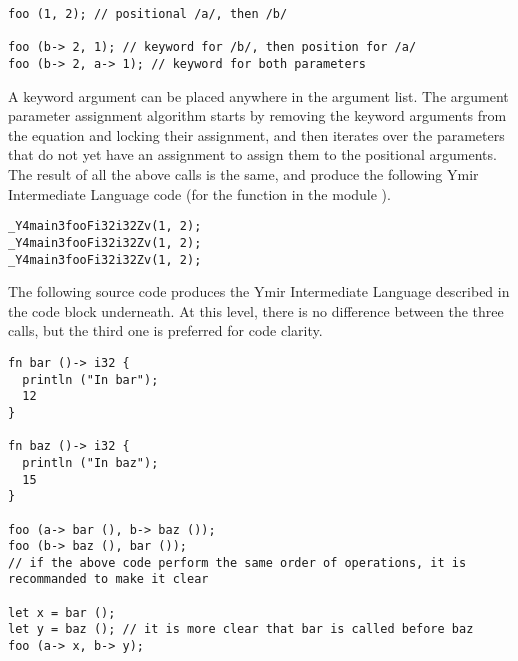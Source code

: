 \begin{lstlisting}[style=coloredverbatim]
foo (1, 2); // positional /a/, then /b/

foo (b-> 2, 1); // keyword for /b/, then position for /a/
foo (b-> 2, a-> 1); // keyword for both parameters
\end{lstlisting}

A keyword argument can be placed anywhere in the argument list. The argument
parameter assignment algorithm starts by removing the keyword arguments from the
equation and locking their assignment, and then iterates over the parameters
that do not yet have an assignment to assign them to the positional arguments.
The result of all the above calls is the same, and produce the following Ymir
Intermediate Language code (for the function  in the module
).

\begin{lstlisting}[style=intermediateVerb]
_Y4main3fooFi32i32Zv(1, 2);
_Y4main3fooFi32i32Zv(1, 2);
_Y4main3fooFi32i32Zv(1, 2);
\end{lstlisting}



The following source code produces the Ymir Intermediate Language described in
the code block underneath. At this level, there is no difference between the
three calls, but the third one is preferred for code clarity.

\begin{lstlisting}[style=coloredverbatim]
fn bar ()-> i32 {
  println ("In bar");
  12
}

fn baz ()-> i32 {
  println ("In baz");
  15
}

foo (a-> bar (), b-> baz ());
foo (b-> baz (), bar ());
// if the above code perform the same order of operations, it is recommanded to make it clear

let x = bar ();
let y = baz (); // it is more clear that bar is called before baz
foo (a-> x, b-> y);
\end{lstlisting}
\smallskip


